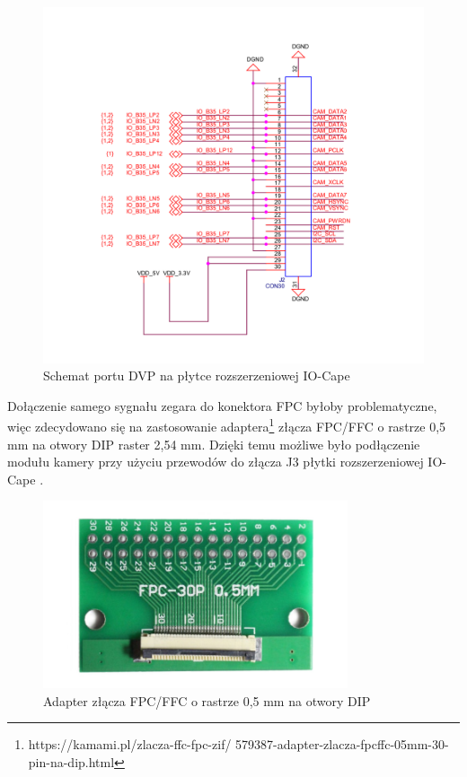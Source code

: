 \begin{figure}[!h]
  \centering
  \includegraphics[width=\textwidth]{img/cam-schematic.png}
  \caption{Schemat portu DVP na płytce rozszerzeniowej IO-Cape \cite{ZturnIOCapeSchematic}}
  \label{cam-schematic}
\end{figure}

Dołączenie samego sygnału zegara do konektora FPC byłoby problematyczne, więc zdecydowano się na 
zastosowanie adaptera\footnote{https://kamami.pl/zlacza-ffc-fpc-zif/
579387-adapter-zlacza-fpcffc-05mm-30-pin-na-dip.html} złącza FPC/FFC o 
rastrze 0,5 mm na otwory DIP raster 2,54 mm. Dzięki temu możliwe było podłączenie modułu kamery 
przy użyciu przewodów do złącza J3 płytki rozszerzeniowej IO-Cape \cite{ZturnIOCapeSchematic}.


\begin{figure}[!h]
  \centering
  \includegraphics[width=0.8\textwidth]{img/dvp-adapter.jpg}
  \caption{Adapter złącza FPC/FFC o rastrze 0,5 mm na otwory DIP \cite{zlacze-dvp-obraz}}
  \label{cam-schematic}
\end{figure}


